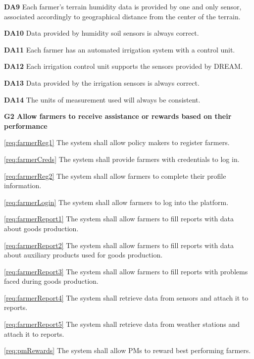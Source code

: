 \documentclass[10pt]{article}
\begin{document}
\begin{description}
\begin{description}
            \item \textbf{DA9} Each farmer's terrain humidity data is provided by one and only sensor, associated accordingly to geographical distance from the center of the terrain.
            \item \textbf{DA10} Data provided by humidity soil sensors is always correct.
            \item \textbf{DA11} Each farmer has an automated irrigation system with a control unit.
            \item \textbf{DA12} Each irrigation control unit supports the sensors provided by DREAM.
            \item \textbf{DA13} Data provided by the irrigation sensors is always correct.
            \item \textbf{DA14} The units of measurement used will always be consistent. 
        \end{description}
    \item \textbf{G2 Allow farmers to receive assistance or rewards based on their performance}
        \begin{description}
            \item \ref{req:farmerReg1} The system shall allow policy makers to register farmers.    
            \item \ref{req:farmerCreds} The system shall provide farmers with credentials to log in.
            \item \ref{req:farmerReg2} The system shall allow farmers to complete their profile information.
            \item \ref{req:farmerLogin} The system shall allow farmers to log into the platform.
            \item \ref{req:farmerReport1} The system shall allow farmers to fill reports with data about goods production.
            \item \ref{req:farmerReport2} The system shall allow farmers to fill reports with data about auxiliary products used for goods production.
            \item \ref{req:farmerReport3} The system shall allow farmers to fill reports with problems faced during goods production.
            \item \ref{req:farmerReport4} The system shall retrieve data from sensors and attach it to reports.
            \item \ref{req:farmerReport5} The system shall retrieve data from weather stations and attach it to reports.
            \item \ref{req:pmRewards} The system shall allow PMs to reward best performing farmers.

\end{description}
\end{description}
\end{document}
